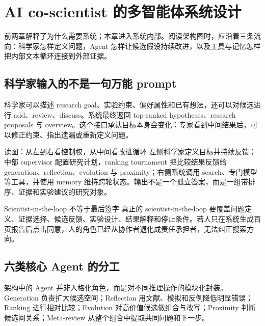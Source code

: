 \section{AI co-scientist 的多智能体系统设计}

前两章解释了为什么需要系统；本章进入系统内部。阅读架构图时，应沿着三条流向：科学家怎样定义问题，Agent 怎样让候选假设持续改进，以及工具与记忆怎样把内部文本循环连接到外部证据。

\subsection{科学家输入的不是一句万能 prompt}

科学家可以描述 research goal、实验约束、偏好属性和已有想法，还可以对候选进行 add、review、discuss。系统最终返回 top-ranked hypotheses、research proposals 与 overview。这个接口承认目标本身会变化：专家看到中间结果后，可以修正约束、指出遗漏或重新定义问题。


\begin{knowledgebox}{读图：从左到右看控制权，从中间看改进循环}
左侧科学家定义目标并持续反馈；中部 supervisor 配置研究计划，ranking tournament 把比较结果反馈给 generation、reflection、evolution 与 proximity；右侧系统调用 search、专门模型等工具，并使用 memory 维持跨轮状态。输出不是一个孤立答案，而是一组带排序、证据和实验建议的研究对象。
\end{knowledgebox}


\begin{importantbox}{Scientist-in-the-loop 不等于最后签字}
真正的 scientist-in-the-loop 要覆盖问题定义、证据选择、候选反馈、实验设计、结果解释和停止条件。若人只在系统生成百页报告后点击同意，人的角色已经从协作者退化成责任承担者，无法纠正搜索方向。
\end{importantbox}

\subsection{六类核心 Agent 的分工}

架构中的 Agent 并非人格化角色，而是对不同推理操作的模块化封装。Generation 负责扩大候选空间；Reflection 用文献、模拟和反例降低明显错误；Ranking 进行相对比较；Evolution 对高价值候选做组合与改写；Proximity 判断候选间关系；Meta-review 从整个组合中提取共同问题和下一步。

